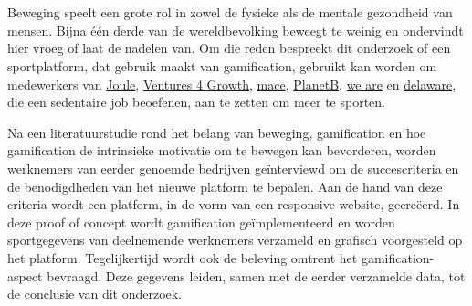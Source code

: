 
%
%
%
%




\chapter*{}

Beweging speelt een grote rol in zowel de fysieke als de mentale gezondheid van mensen. Bijna één derde van de wereldbevolking beweegt te weinig en ondervindt hier vroeg of laat de nadelen van. Om die reden bespreekt dit onderzoek of een sportplatform, dat gebruik maakt van gamification, gebruikt kan worden om medewerkers van \href{https://en.joule.be/}{Joule}, \href{https://www.ventures4growth.com/en}{Ventures 4 Growth}, \href{https://www.mace-legal.com/}{mace}, \href{https://planetb.life/en}{PlanetB}, \href{https://www.we-are.be/}{we are} en \href{https://www.delaware.pro/en-be}{delaware}, die een sedentaire job beoefenen, aan te zetten om meer te sporten.

Na een literatuurstudie rond het belang van beweging, gamification en hoe gamification de intrinsieke motivatie om te bewegen kan bevorderen, worden werknemers van eerder genoemde bedrijven geïnterviewd om de succescriteria en de benodigdheden van het nieuwe platform te bepalen. Aan de hand van deze criteria wordt een platform, in de vorm van een responsive website, gecreëerd. In deze proof of concept wordt gamification geïmplementeerd en worden sportgegevens van deelnemende werknemers verzameld en grafisch voorgesteld op het platform. Tegelijkertijd wordt ook de beleving omtrent het gamification-aspect bevraagd. Deze gegevens leiden, samen met de eerder verzamelde data, tot de conclusie van dit onderzoek.

